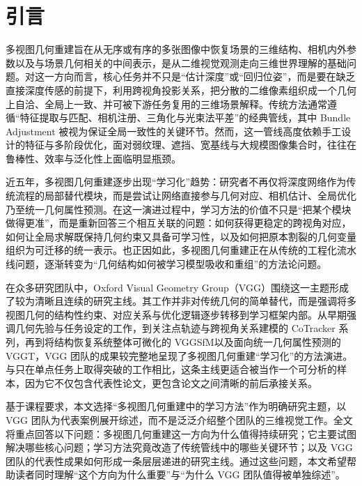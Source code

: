 \section{引言}

多视图几何重建旨在从无序或有序的多张图像中恢复场景的三维结构、相机内外参数以及与场景几何相关的中间表示，是从二维视觉观测走向三维世界理解的基础问题。对这一方向而言，核心任务并不只是“估计深度”或“回归位姿”，而是要在缺乏直接深度传感的前提下，利用跨视角投影关系，把分散的二维像素组织成一个几何上自洽、全局上一致、并可被下游任务复用的三维场景解释。传统方法通常遵循“特征提取与匹配、相机注册、三角化与光束法平差”的经典管线，其中 Bundle Adjustment 被视为保证全局一致性的关键环节\cite{triggs2000bundle,schoenberger2016colmap}。然而，这一管线高度依赖手工设计的特征与多阶段优化，面对弱纹理、遮挡、宽基线与大规模图像集合时，往往在鲁棒性、效率与泛化性上面临明显瓶颈\cite{wang2021deep2view,wang2024vggsfm}。

近五年，多视图几何重建逐步出现“学习化”趋势：研究者不再仅将深度网络作为传统流程的局部替代模块，而是尝试让网络直接参与几何对应、相机估计、全局优化乃至统一几何属性预测\cite{bhalgat2023lighttouch,karaev2024cotracker,wang2025vggt}。在这一演进过程中，学习方法的价值不只是“把某个模块做得更准”，而是重新回答三个相互关联的问题：如何获得更稳定的跨视角对应，如何让全局求解既保持几何约束又具备可学习性，以及如何把原本割裂的几何变量组织为可迁移的统一表示\cite{wang2024vggsfm,wang2025vggt}。也正因如此，多视图几何重建正在从传统的工程化流水线问题，逐渐转变为“几何结构如何被学习模型吸收和重组”的方法论问题。

在众多研究团队中，Oxford Visual Geometry Group（VGG）围绕这一主题形成了较为清晰且连续的研究主线。其工作并非对传统几何的简单替代，而是强调将多视图几何的结构性约束、对应关系与优化逻辑逐步转移到学习框架内部。从早期强调几何先验与任务设定的工作\cite{wu2020unsup3d,wang2021deep2view}，到关注点轨迹与跨视角关系建模的 CoTracker 系列\cite{karaev2024cotracker,karaev2025cotracker3}，再到将结构恢复系统整体可微化的 VGGSfM\cite{wang2024vggsfm}以及面向统一几何属性预测的 VGGT\cite{wang2025vggt}，VGG 团队的成果较完整地呈现了多视图几何重建“学习化”的方法演进。与只在单点任务上取得突破的工作相比，这条主线更适合被当作一个可分析的样本，因为它不仅包含代表性论文，更包含论文之间清晰的前后承接关系。

基于课程要求，本文选择“多视图几何重建中的学习方法”作为明确研究主题，以 VGG 团队为代表案例展开综述，而不是泛泛介绍整个团队的三维视觉工作。全文将重点回答以下问题：多视图几何重建这一方向为什么值得持续研究；它主要试图解决哪些核心问题；学习方法究竟改造了传统管线中的哪些关键环节；以及 VGG 团队的代表性成果如何形成一条层层递进的研究主线。通过这些问题，本文希望帮助读者同时理解“这个方向为什么重要”与“为什么 VGG 团队值得被单独综述”。

